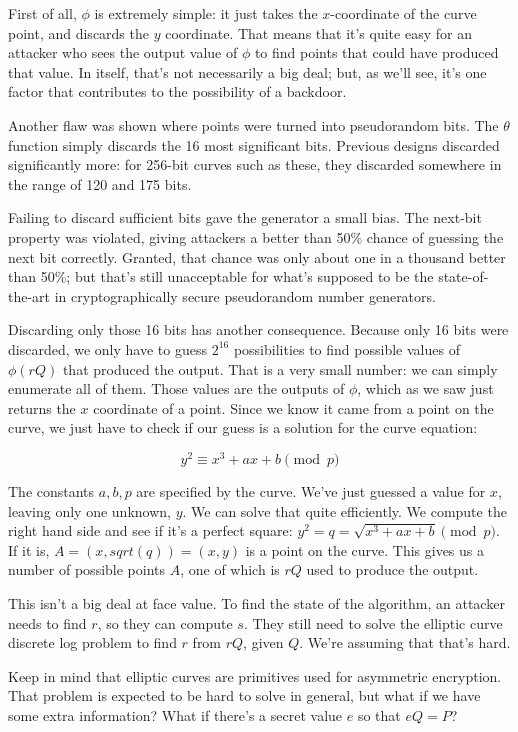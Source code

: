 \documentclass[11pt,ebook,table,dvipsnames]{memoir}
\begin{document}
First of all, $\phi$ is extremely simple: it just takes the
$x$-coordinate of the curve point, and discards the $y$ coordinate.
That means that it's quite easy for an attacker who sees the output
value of $\phi$ to find points that could have produced that value. In
itself, that's not necessarily a big deal; but, as we'll see, it's one
factor that contributes to the possibility of a backdoor.

Another flaw was shown where points were turned into pseudorandom
bits. The $\theta$ function simply discards the 16 most significant
bits. Previous designs discarded significantly more: for 256-bit
curves such as these, they discarded somewhere in the range of 120 and
175 bits.

Failing to discard sufficient bits gave the generator a small bias.
The next-bit property was violated, giving attackers a better than 50\%
chance of guessing the next bit correctly. Granted, that chance was
only about one in a thousand better than 50\%; but that's still
unacceptable for what's supposed to be the state-of-the-art in
cryptographically secure pseudorandom number generators.

Discarding only those 16 bits has another consequence. Because only 16
bits were discarded, we only have to guess $2^{16}$ possibilities to
find possible values of $\phi(rQ)$ that produced the output. That is a
very small number: we can simply enumerate all of them. Those values
are the outputs of $\phi$, which as we saw just returns the $x$
coordinate of a point. Since we know it came from a point on the
curve, we just have to check if our guess is a solution for the curve
equation:

\[
y^2 \equiv x^3 + ax + b \pmod p
\]

The constants $a, b, p$ are specified by the curve. We've just guessed
a value for $x$, leaving only one unknown, $y$. We can solve that
quite efficiently. We compute the right hand side and see if it's a
perfect square: $y^2 = q = \sqrt{x^3 + ax + b} \pmod p$. If it is, $A
= (x, sqrt(q)) = (x, y)$ is a point on the curve. This gives us a
number of possible points $A$, one of which is $rQ$ used to produce
the output.

This isn't a big deal at face value. To find the state of the
algorithm, an attacker needs to find $r$, so they can compute $s$.
They still need to solve the elliptic curve discrete log problem to
find $r$ from $rQ$, given $Q$. We're assuming that that's hard.

Keep in mind that elliptic curves are primitives used for asymmetric
encryption. That problem is expected to be hard to solve in general,
but what if we have some extra information? What if there's a secret
value $e$ so that $eQ=P$?
\end{document}
